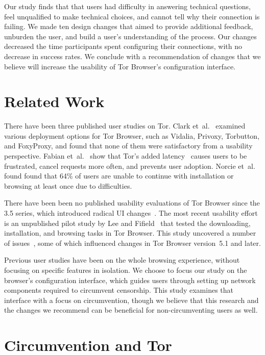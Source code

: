 \documentclass[USenglish,oneside,twocolumn]{article}
\begin{document}
Our study finds that that users had difficulty in answering technical questions, feel unqualified to make technical choices, and cannot tell why their connection is failing. We made ten design changes that aimed to provide additional feedback, unburden the user, and build a user's understanding of the process. Our changes decreased the time participants spent configuring their connections, with no decrease in success rates. We conclude with a recommendation of changes that we believe will increase the usability of Tor Browser's configuration interface. 

\section{Related Work} 
There have been three published user studies on Tor. Clark et~al.~\cite{clark2007usability} examined various deployment
options for Tor Browser, such as Vidalia, Privoxy, Torbutton, and FoxyProxy, and found that none of them 
were satisfactory from a usability perspective. Fabian et~al.~\cite{fabian2010privately} show that Tor's added
latency~\cite{dingledine2009performance} causes users
to be frustrated, cancel requests more often, and prevents user adoption. 
Norcie et~al.~\cite{norcie2012eliminating} found found that 
64\% of users are unable to continue with installation or browsing at least once due to difficulties.

There have been been no published usability evaluations of
Tor Browser since the 3.5 series, which introduced radical UI changes~\cite{torbrowser-35}.
The most recent usability effort is an unpublished pilot study by Lee and Fifield~\cite{uxsprint} 
that tested the downloading, installation, and browsing tasks in Tor Browser.  This study uncovered a number of issues~\cite{uxsprint2015-tickets},
some of which influenced changes in Tor Browser version~5.1 and later.

Previous user studies have been on the whole browsing experience,
without focusing on specific features in isolation.
We choose to focus our study on 
the browser's configuration interface, which guides users through setting up network components required to circumvent censorship. 
This study examines that interface with a focus on circumvention,
though we believe that this research and the changes we recommend
can be beneficial for non-circumventing users as well.

\section{Circumvention and Tor}
\end{document}
